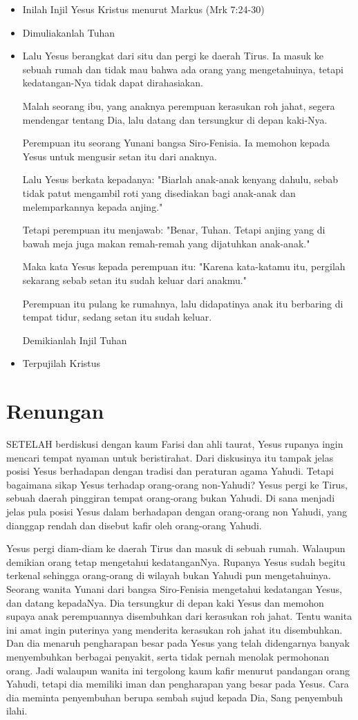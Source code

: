 \documentclass[a4paper,12pt]{article}
\newcommand{\BU}[1]{\begin{itemize} \item[U:] #1 \end{itemize}}
\newcommand{\BP}[1]{\begin{itemize} \item[P:] #1 \end{itemize}}
\begin{document}
\BP{Inilah Injil Yesus Kristus menurut Markus (Mrk 7:24-30)}

\BU{Dimuliakanlah Tuhan}
	
\BP{Lalu Yesus berangkat dari situ dan pergi ke daerah Tirus. Ia masuk ke sebuah rumah dan tidak mau bahwa ada orang yang mengetahuinya, tetapi kedatangan-Nya tidak dapat dirahasiakan.
	
	Malah seorang ibu, yang anaknya perempuan kerasukan roh jahat, segera mendengar tentang Dia, lalu datang dan tersungkur di depan kaki-Nya.
	
	Perempuan itu seorang Yunani bangsa Siro-Fenisia. Ia memohon kepada Yesus untuk mengusir setan itu dari anaknya.
	
	Lalu Yesus berkata kepadanya: "Biarlah anak-anak kenyang dahulu, sebab tidak patut mengambil roti yang disediakan bagi anak-anak dan melemparkannya kepada anjing."
	
	Tetapi perempuan itu menjawab: "Benar, Tuhan. Tetapi anjing yang di bawah meja juga makan remah-remah yang dijatuhkan anak-anak."
	
	Maka kata Yesus kepada perempuan itu: "Karena kata-katamu itu, pergilah sekarang sebab setan itu sudah keluar dari anakmu."
	
	Perempuan itu pulang ke rumahnya, lalu didapatinya anak itu berbaring di tempat tidur, sedang setan itu sudah keluar.
	

    Demikianlah Injil Tuhan}

\BU{Terpujilah Kristus}

\section{Renungan}

SETELAH berdiskusi dengan kaum Farisi dan ahli taurat, Yesus rupanya ingin mencari tempat nyaman untuk beristirahat. Dari diskusinya itu tampak jelas posisi Yesus berhadapan dengan tradisi dan peraturan agama Yahudi. Tetapi bagaimana sikap Yesus terhadap orang-orang non-Yahudi? Yesus pergi ke Tirus, sebuah daerah pinggiran tempat orang-orang bukan Yahudi. Di sana menjadi jelas pula posisi Yesus dalam berhadapan dengan orang-orang non Yahudi, yang dianggap rendah dan disebut kafir oleh orang-orang Yahudi.

Yesus pergi diam-diam ke daerah Tirus dan masuk di sebuah rumah. Walaupun demikian orang tetap mengetahui kedatanganNya. Rupanya Yesus sudah begitu terkenal sehingga orang-orang di wilayah bukan Yahudi pun mengetahuinya. Seorang wanita Yunani dari bangsa Siro-Fenisia mengetahui kedatangan Yesus, dan datang kepadaNya. Dia tersungkur di depan kaki Yesus dan memohon supaya anak perempuannya disembuhkan dari kerasukan roh jahat.  Tentu wanita ini amat ingin puterinya yang menderita kerasukan roh jahat itu disembuhkan. Dan dia menaruh pengharapan besar pada Yesus yang telah didengarnya banyak menyembuhkan berbagai penyakit, serta tidak pernah menolak permohonan orang. Jadi walaupun wanita ini tergolong kaum kafir menurut pandangan orang Yahudi, tetapi dia memiliki iman dan pengharapan yang besar pada Yesus. Cara dia meminta penyembuhan berupa sembah sujud kepada Dia, Sang penyembuh ilahi.
\end{document}
